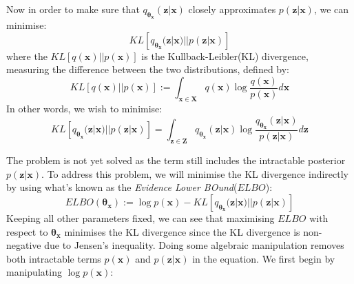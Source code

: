             Now in order to make sure that $q_{\bm{\theta_x}}(\bm{z}|\bm{x})$ closely approximates $p(\bm{z}|\bm{x})$, we can minimise:
                \[ KL\left[q_{\bm{\theta_x}}(\bm{z}|\bm{x}) || p(\bm{z}|\bm{x})\right] \]
            where the $KL\left[q(\bm{x}) || p(\bm{x})\right]$ is the Kullback-Leibler(KL) divergence, measuring the difference between the two distributions, defined by:
                \[ KL\left[q(\bm{x}) || p(\bm{x})\right] := \int_{\bm{x} \in \bm{X}} q(\bm{x}) \log \frac{q(\bm{x})}{p(\bm{x})} d\bm{x}\]
            In other words, we wish to minimise:
                \[ KL\left[q_{\bm{\theta_x}}(\bm{z}|\bm{x}) || p(\bm{z}|\bm{x})\right] = \int_{\bm{z} \in \bm{Z}} q_{\bm{\theta_x}}(\bm{z}|\bm{x}) \log \frac{q_{\bm{\theta_x}}(\bm{z}|\bm{x})}{p(\bm{z}|\bm{x})} d\bm{z}\]
            
            The problem is not yet solved as the term still includes the intractable posterior $p(\bm{z}|\bm{x})$. To address this problem, we will minimise the KL divergence indirectly by using what's known as the \textit{Evidence Lower BOund}($ELBO$):
                \[ ELBO(\bm{\theta_x}) := \log p(\bm{x}) - KL\left[q_{\bm{\theta_x}}(\bm{z}|\bm{x}) || p(\bm{z}|\bm{x})\right] \]
            Keeping all other parameters fixed, we can see that maximising $ELBO$ with respect to $\bm{\theta_x}$ minimises the KL divergence since the KL divergence is non-negative due to Jensen's inequality\citep{jensen1906fonctions}. Doing some algebraic manipulation removes both intractable terms $p(\bm{x})$ and $p(\bm{z}|\bm{x})$ in the equation. We first begin by manipulating $\log p(\bm{x})$:
            

